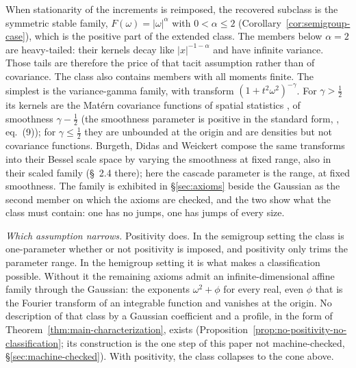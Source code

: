 When stationarity of the increments is reimposed, the recovered
subclass is the symmetric stable family, $F(\omega) = |\omega|^\alpha$ with
$0 < \alpha \le 2$ (Corollary~\ref{cor:semigroup-case}), which is the positive part of the
extended class. The members below $\alpha = 2$ are heavy-tailed: their kernels decay like
$|x|^{-1-\alpha}$ and have infinite variance. Those tails are therefore the price of that
tacit assumption rather than of covariance. The class also contains members with all
moments finite. The simplest is the variance-gamma family, with transform
$(1 + t^2\omega^2)^{-\gamma}$. For $\gamma > \tfrac12$ its kernels are the Mat\'ern
covariance functions of spatial statistics
, of smoothness
$\gamma - \tfrac12$ (the smoothness parameter is positive in the standard form,
, eq.~(9)); for $\gamma \le \tfrac12$ they are unbounded at the
origin and are densities but not covariance functions. Burgeth, Didas and Weickert
 compose the same transforms into their Bessel scale space by
varying the smoothness at fixed range, also in their scaled family (\S~2.4 there); here the
cascade parameter is the range, at fixed smoothness. The family is exhibited in
\S\ref{sec:axioms} beside the Gaussian as the second member on which the axioms are
checked, and the two show what the class must contain: one has no jumps, one has jumps of
every size.

\emph{Which assumption narrows.} Positivity does. In the semigroup setting the class is
one-parameter whether or not positivity is imposed, and positivity only trims the parameter
range. In the hemigroup setting it is what makes a classification possible. Without it the
remaining axioms admit an infinite-dimensional affine family through the Gaussian: the
exponents $\omega^2 + \phi$ for every real, even $\phi$ that is the Fourier transform of an
integrable function and vanishes at the origin. No description of that class by a Gaussian
coefficient and a profile, in the form of Theorem~\ref{thm:main-characterization}, exists
(Proposition~\ref{prop:no-positivity-no-classification}; its construction is the one step
of this paper not machine-checked, \S\ref{sec:machine-checked}). With positivity, the class
collapses to the cone above.

